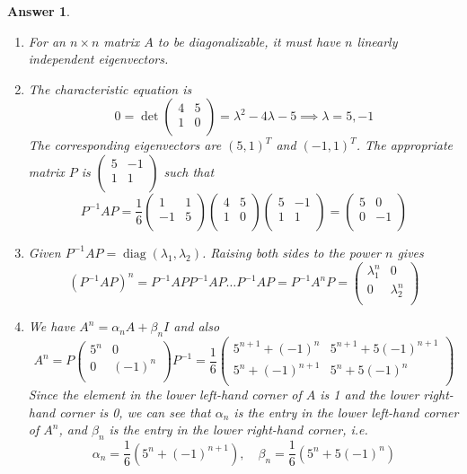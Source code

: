 \documentclass[a4paper]{article}
\DeclareMathOperator{\diag}{diag}
\newtheorem{ans}{Answer}[section]
\theoremstyle{new}
\begin{document}
\begin{ans}\leavevmode
\begin{enumerate}[label=(\alph*)]
\item For an $n\times n$ matrix $A$ to be diagonalizable, it must have $n$ linearly independent eigenvectors.
\item The characteristic equation is 
$$0=\det\begin{pmatrix}4&5\\1&0\\\end{pmatrix}=\lambda^2-4\lambda-5\implies\lambda=5,-1$$
The corresponding eigenvectors are $(5,1)^T$ and $(-1,1)^T$. The appropriate matrix $P$ is $\begin{pmatrix}5&-1\\1&1\\\end{pmatrix}$ such that
$$P^{-1}AP=\frac{1}{6}\begin{pmatrix}1&1\\-1&5\\\end{pmatrix}\begin{pmatrix}4&5\\1&0\\\end{pmatrix}\begin{pmatrix}5&-1\\1&1\\\end{pmatrix}=\begin{pmatrix}5&0\\0&-1\\\end{pmatrix}$$
\item Given $P^{-1}AP=\diag(\lambda_1,\lambda_2)$. Raising both sides to the power $n$ gives
$$(P^{-1}AP)^n=P^{-1}APP^{-1}AP\dots P^{-1}AP=P^{-1}A^nP=\begin{pmatrix}\lambda_1^n&0\\0&\lambda_2^n\\\end{pmatrix}$$
\item We have $A^n=\alpha_nA+\beta_nI$ and also
$$A^n=P\begin{pmatrix}5^n&0\\0&(-1)^n\\\end{pmatrix}P^{-1}=\frac{1}{6}\begin{pmatrix}5^{n+1}+(-1)^n&5^{n+1}+5(-1)^{n+1}\\5^n+(-1)^{n+1}&5^n+5(-1)^n\\\end{pmatrix}$$
Since the element in the lower left-hand corner of $A$ is 1 and the lower right-hand corner is 0, we can see that $\alpha_n$ is the entry in the lower left-hand corner of $A^n$, and $\beta_n$ is the entry in the lower right-hand corner, i.e.
$$\alpha_n=\frac{1}{6}(5^n+(-1)^{n+1}),\quad \beta_n=\frac{1}{6}(5^n+5(-1)^n)$$
\end{enumerate}
\end{ans}
\end{document}

